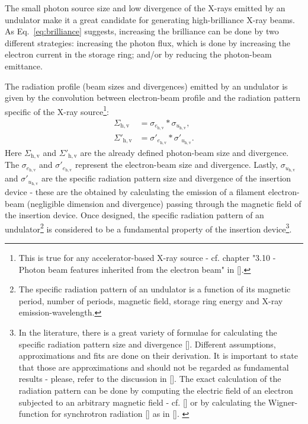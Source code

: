 \begin{refsection}
The small photon source size and low divergence of the X-rays emitted by an undulator make it a great candidate for generating high-brilliance X-ray beams. As Eq.~\ref{eq:brilliance} suggests, increasing the brilliance can be done by two different strategies: increasing the photon flux, which is done by increasing the electron current in the storage ring; and/or by reducing the photon-beam emittance.

The radiation profile (beam sizes and divergences) emitted by an undulator is given by the convolution between electron-beam profile and the radiation pattern specific of the X-ray source\footnote{This is true for any accelerator-based X-ray source - cf. chapter "3.10 - Photon beam features inherited from the electron beam" in [\cite{Talman2006}].}: 
\begin{subequations}\label{eq:undulator}
    \begin{align}   
    \Sigma_{\mathrm{h,v}} &= \sigma_{e_{\mathrm{h,v}}}*\sigma_{u_{\mathrm{h,v}}},\\
    \Sigma'_{\mathrm{h,v}} &= \sigma'_{e_{\mathrm{h,v}}}*\sigma'_{u_{\mathrm{h,v}}}.
    \end{align}
\end{subequations}{}
Here $\Sigma_{\mathrm{h,v}}$ and $\Sigma'_{\mathrm{h,v}}$ are the already defined photon-beam size and divergence. The $\sigma_{e_{\mathrm{h,v}}}$ and $\sigma'_{e_{\mathrm{h,v}}}$ represent the electron-beam size and divergence. Lastly, $\sigma_{u_{\mathrm{h,v}}}$ and $\sigma'_{u_{\mathrm{h,v}}}$ are the specific radiation pattern size and divergence of the insertion device - these are the obtained by calculating the emission of a filament electron-beam (negligible dimension and divergence) passing through the magnetic field of the insertion device. Once designed, the specific radiation pattern of an undulator\footnote{The specific radiation pattern of an undulator is a function of its magnetic period, number of periods, magnetic field, storage ring energy and X-ray emission-wavelength.} is considered to be a fundamental property of the insertion device\footnote{In the literature, there is a great variety of formulae for calculating the specific radiation pattern size and divergence [\cite{Kim1986, Kim1989, Tanaka2009, Elleaume2013}]. Different assumptions, approximations and fits are done on their derivation. It is important to state that those are approximations and should not be regarded as fundamental results - please, refer to the discussion in [\cite{Walker2019}]. The exact calculation of the radiation pattern can be done by computing the electric field of an electron subjected to an arbitrary magnetic field - cf. [\cite{Chubar1995, Chubar2001}] or by calculating the Wigner-function for synchrotron radiation [\cite{Bazarov2012}] as in [\cite{Tanaka2014}]. \label{note:und_prof}}.


\end{refsection}
